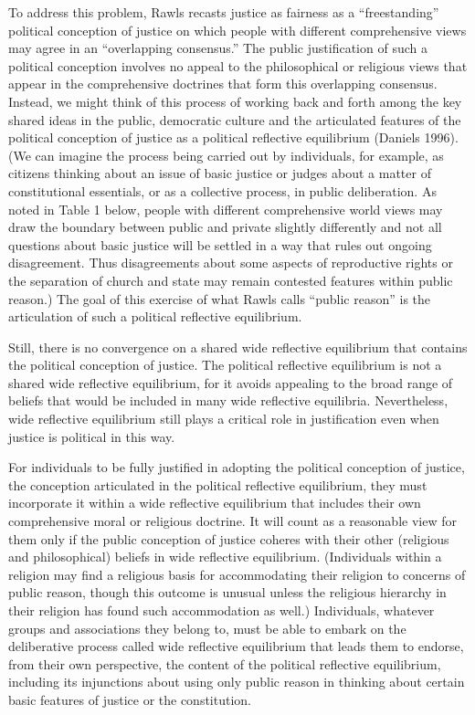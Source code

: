 \documentclass[]{article}
\begin{document}
To address this problem, Rawls recasts justice as fairness as a
``freestanding'' political conception of justice on which people with
different comprehensive views may agree in an ``overlapping consensus.''
The public justification of such a political conception involves no
appeal to the philosophical or religious views that appear in the
comprehensive doctrines that form this overlapping consensus. Instead,
we might think of this process of working back and forth among the key
shared ideas in the public, democratic culture and the articulated
features of the political conception of justice as a political
reflective equilibrium (Daniels 1996). (We can imagine the process being
carried out by individuals, for example, as citizens thinking about an
issue of basic justice or judges about a matter of constitutional
essentials, or as a collective process, in public deliberation. As noted
in Table 1 below, people with different comprehensive world views may
draw the boundary between public and private slightly differently and
not all questions about basic justice will be settled in a way that
rules out ongoing disagreement. Thus disagreements about some aspects of
reproductive rights or the separation of church and state may remain
contested features within public reason.) The goal of this exercise of
what Rawls calls ``public reason'' is the articulation of such a
political reflective equilibrium.

Still, there is no convergence on a shared wide reflective equilibrium
that contains the political conception of justice. The political
reflective equilibrium is not a shared wide reflective equilibrium, for
it avoids appealing to the broad range of beliefs that would be included
in many wide reflective equilibria. Nevertheless, wide reflective
equilibrium still plays a critical role in justification even when
justice is political in this way.

For individuals to be fully justified in adopting the political
conception of justice, the conception articulated in the political
reflective equilibrium, they must incorporate it within a wide
reflective equilibrium that includes their own comprehensive moral or
religious doctrine. It will count as a reasonable view for them only if
the public conception of justice coheres with their other (religious and
philosophical) beliefs in wide reflective equilibrium. (Individuals
within a religion may find a religious basis for accommodating their
religion to concerns of public reason, though this outcome is unusual
unless the religious hierarchy in their religion has found such
accommodation as well.) Individuals, whatever groups and associations
they belong to, must be able to embark on the deliberative process
called wide reflective equilibrium that leads them to endorse, from
their own perspective, the content of the political reflective
equilibrium, including its injunctions about using only public reason in
thinking about certain basic features of justice or the constitution.
\end{document}
